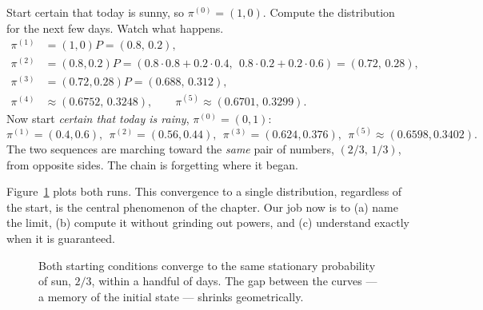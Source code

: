 \begin{walkbox}
Start certain that today is sunny, so $\pi^{(0)} = (1,0)$. Compute the
distribution for the next few days. Watch what happens.
\[
  \begin{aligned}
    \pi^{(1)} &= (1,0)P = (0.8,\,0.2),\\
    \pi^{(2)} &= (0.8,0.2)P = (0.8\cdot0.8 + 0.2\cdot0.4,\ \ 0.8\cdot0.2 + 0.2\cdot0.6) = (0.72,\,0.28),\\
    \pi^{(3)} &= (0.72,0.28)P = (0.688,\,0.312),\\
    \pi^{(4)} &\approx (0.6752,\,0.3248),\qquad
    \pi^{(5)} \approx (0.6701,\,0.3299).
  \end{aligned}
\]
Now start \emph{certain that today is rainy}, $\pi^{(0)}=(0,1)$:
\[
  \pi^{(1)} = (0.4,0.6),\ \ \pi^{(2)}=(0.56,0.44),\ \ \pi^{(3)}=(0.624,0.376),\ \ \pi^{(5)}\approx(0.6598,0.3402).
\]
The two sequences are marching toward the \emph{same} pair of numbers,
$(2/3,\,1/3)$, from opposite sides. The chain is forgetting where it began.
\end{walkbox}

Figure~\ref{ch24:fig-weather-converge} plots both runs. This convergence to a
single distribution, regardless of the start, is the central phenomenon of the
chapter. Our job now is to (a) name the limit, (b) compute it without grinding
out powers, and (c) understand exactly when it is guaranteed.

\begin{figure}[H]
  \centering
  \caption{Both starting conditions converge to the same stationary
  probability of sun, $2/3$, within a handful of days. The gap between the curves
  --- a memory of the initial state --- shrinks geometrically.}
  \label{ch24:fig-weather-converge}
\end{figure}

